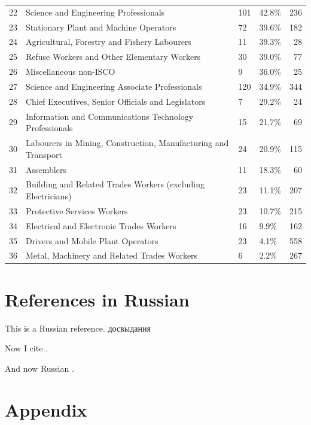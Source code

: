 \documentclass[12pt,a4paper]{article}
\begin{document}
\begin{table}[ht]
\begin{small}
\begin{tabular}{rp{8cm}llr}
  22 & Science and Engineering Professionals & 101 & 42.8\% & 236 \\ 
  23 & Stationary Plant and Machine Operators & 72 & 39.6\% & 182 \\ 
  24 & Agricultural, Forestry and Fishery Labourers & 11 & 39.3\% &  28 \\ 
  25 & Refuse Workers and Other Elementary Workers & 30 & 39.0\% &  77 \\ 
  26 & Miscellaneous non-ISCO & 9 & 36.0\% &  25 \\ 
  27 & Science and Engineering Associate Professionals & 120 & 34.9\% & 344 \\ 
  28 & Chief Executives, Senior Officials and Legislators & 7 & 29.2\% &  24 \\ 
  29 & Information and Communications Technology Professionals & 15 & 21.7\% &  69 \\ 
  30 & Labourers in Mining, Construction, Manufacturing and Transport & 24 & 20.9\% & 115 \\ 
  31 & Assemblers & 11 & 18.3\% &  60 \\ 
  32 & Building and Related Trades Workers (excluding Electricians) & 23 & 11.1\% & 207 \\ 
  33 & Protective Services Workers & 23 & 10.7\% & 215 \\ 
  34 & Electrical and Electronic Trades Workers & 16 & 9.9\% & 162 \\ 
  35 & Drivers and Mobile Plant Operators & 23 & 4.1\% & 558 \\ 
  36 & Metal, Machinery and Related Trades Workers & 6 & 2.2\% & 267 \\ 
   \hline
\end{tabular}
\end{small}
\end{table}


\section*{References in Russian}

 This is a Russian reference. \foreignlanguage{russian}{досвыдания}

Now I cite \parencite{carnoy_005._2012}. 

And now Russian
\parencite{blix}. 

\printbibliography


\newpage
\section*{Appendix}
\end{document}
